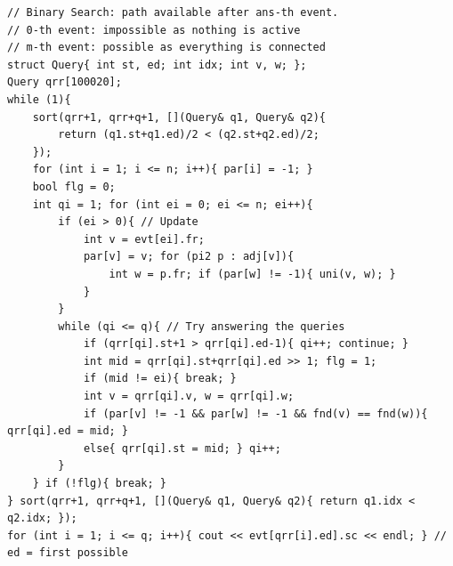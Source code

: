 \begin{verbatim}
// Binary Search: path available after ans-th event.
// 0-th event: impossible as nothing is active
// m-th event: possible as everything is connected
struct Query{ int st, ed; int idx; int v, w; };
Query qrr[100020];
while (1){
	sort(qrr+1, qrr+q+1, [](Query& q1, Query& q2){
		return (q1.st+q1.ed)/2 < (q2.st+q2.ed)/2;
	});
	for (int i = 1; i <= n; i++){ par[i] = -1; }
	bool flg = 0;
	int qi = 1; for (int ei = 0; ei <= n; ei++){
		if (ei > 0){ // Update
			int v = evt[ei].fr;
			par[v] = v; for (pi2 p : adj[v]){
				int w = p.fr; if (par[w] != -1){ uni(v, w); }
			}
		}
		while (qi <= q){ // Try answering the queries
			if (qrr[qi].st+1 > qrr[qi].ed-1){ qi++; continue; }
			int mid = qrr[qi].st+qrr[qi].ed >> 1; flg = 1;
			if (mid != ei){ break; }
			int v = qrr[qi].v, w = qrr[qi].w;
			if (par[v] != -1 && par[w] != -1 && fnd(v) == fnd(w)){ qrr[qi].ed = mid; }
			else{ qrr[qi].st = mid; } qi++;
		}
	} if (!flg){ break; }
} sort(qrr+1, qrr+q+1, [](Query& q1, Query& q2){ return q1.idx < q2.idx; });
for (int i = 1; i <= q; i++){ cout << evt[qrr[i].ed].sc << endl; } // ed = first possible
\end{verbatim}